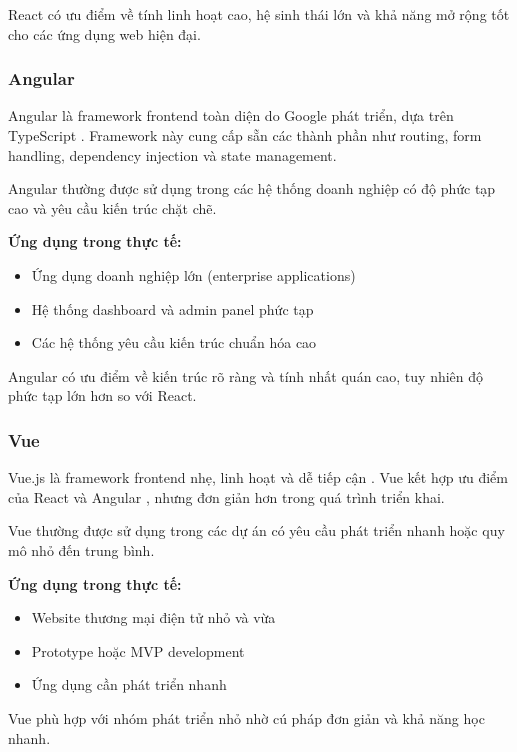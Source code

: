 React có ưu điểm về tính linh hoạt cao, hệ sinh thái lớn và khả năng mở rộng tốt cho các ứng dụng web hiện đại.

\subsubsection{Angular}

Angular là framework frontend toàn diện do Google phát triển, dựa trên TypeScript \textcite{angulardocs2024}. Framework này cung cấp sẵn các thành phần như routing, form handling, dependency injection và state management.

Angular thường được sử dụng trong các hệ thống doanh nghiệp có độ phức tạp cao và yêu cầu kiến trúc chặt chẽ.

\textbf{Ứng dụng trong thực tế:}
\begin{itemize}
    \item Ứng dụng doanh nghiệp lớn (enterprise applications)
    \item Hệ thống dashboard và admin panel phức tạp
    \item Các hệ thống yêu cầu kiến trúc chuẩn hóa cao
\end{itemize}

Angular có ưu điểm về kiến trúc rõ ràng và tính nhất quán cao, tuy nhiên độ phức tạp lớn hơn so với React.

\subsubsection{Vue}

Vue.js là framework frontend nhẹ, linh hoạt và dễ tiếp cận \textcite{vuedocs2024}. Vue kết hợp ưu điểm của React  và Angular , nhưng đơn giản hơn trong quá trình triển khai.

Vue thường được sử dụng trong các dự án có yêu cầu phát triển nhanh hoặc quy mô nhỏ đến trung bình.

\textbf{Ứng dụng trong thực tế:}
\begin{itemize}
    \item Website thương mại điện tử nhỏ và vừa
    \item Prototype hoặc MVP development
    \item Ứng dụng cần phát triển nhanh
\end{itemize}

Vue phù hợp với nhóm phát triển nhỏ nhờ cú pháp đơn giản và khả năng học nhanh.

